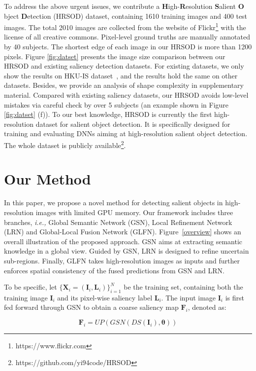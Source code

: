 To address the above urgent issues, we contribute a $\bm{H}$igh-$\bm{R}$esolution $\bm{S}$alient $\bm{O}$bject $\bm{D}$etection (HRSOD) dataset, containing 1610 training images and 400 test images. The total 2010 images are collected from the website of Flickr\footnote{https://www.flickr.com} with the license of all creative commons. Pixel-level ground truths are manually annotated by 40 subjects. The shortest edge of each image in our HRSOD is more than 1200 pixels. Figure \ref{fig:datset} presents the image size comparison between our HRSOD and existing saliency detection datasets. For existing datasets, we only show the results on HKU-IS dataset~\cite{li2015visual}, and the results hold the same on other datasets. Besides, we provide an analysis of shape complexity in supplementary material. Compared with existing saliency datasets, our HRSOD avoids low-level mistakes via careful check by over 5 subjects (an example shown in Figure \ref{fig:datset} (f)). To our best knowledge, HRSOD is currently the first high-resolution dataset for salient object detection. It is specifically designed for training and evaluating DNNs aiming at high-resolution salient object detection. The whole dataset is publicly available\footnote{https://github.com/yi94code/HRSOD}.

\section{Our Method} In this paper, we propose a novel method for detecting salient objects in high-resolution images with limited GPU memory. Our framework includes three branches, \emph{i.e.,} Global Semantic Network (GSN), Local Refinement Network (LRN) and Global-Local Fusion Network (GLFN). Figure~\ref{overview} shows an overall illustration of the proposed approach. GSN aims at extracting semantic knowledge in a global view. Guided by GSN, LRN is designed to refine uncertain sub-regions. Finally, GLFN takes high-resolution images as inputs and further enforces spatial consistency of the fused predictions from GSN and LRN.

To be specific, let $\{\bm{X}_i = (\bm{I}_i, \bm{L}_i)\}_{i=1}^N$ be the training set, containing both the training image $\bm{I}_i$ and its pixel-wise saliency label $\bm{L}_i$. The input image $\bm{I}_i$ is first fed forward through GSN to obtain a coarse saliency map $\bm{F}_i$, denoted as:

\begin{equation}
\bm{F}_i = UP(GSN(DS(\bm{I}_i), \bm{\theta}))
\end{equation}

